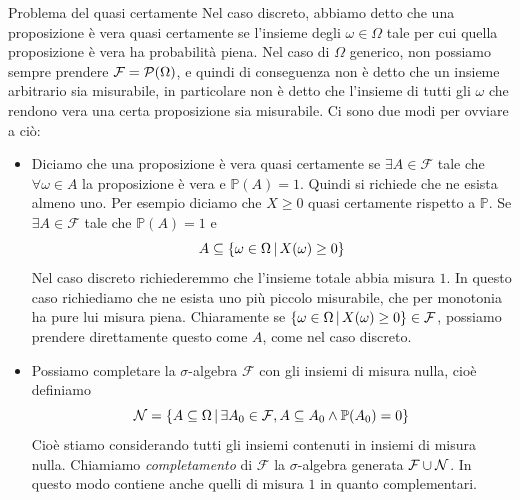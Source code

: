 \documentclass[a4paper]{article}
\begin{document}
\begin{snippetnote}{Problema del quasi certamente}
    Nel caso discreto, abbiamo detto che una proposizione
    è vera quasi certamente se l'insieme degli \(\omega \in \Omega\)
    tale per cui quella proposizione è vera ha probabilità piena.
    Nel caso di \(\Omega\) generico, non possiamo sempre prendere \(\mathcal F = \mathcal P(\Omega)\),
    e quindi di conseguenza non è detto che un insieme arbitrario sia misurabile,
    in particolare non è detto che l'insieme di tutti gli \(\omega\)
    che rendono vera una certa proposizione sia misurabile.
    Ci sono due modi per ovviare a ciò:
    \begin{itemize}
        \item Diciamo che una proposizione è vera quasi certamente se \(\exists A \in \mathcal F\)
            tale che \(\forall \omega \in A\) la proposizione è vera e \(\mathbb P(A) = 1\).
            Quindi si richiede che ne esista almeno uno. Per esempio diciamo che \(X \geq 0\)
            quasi certamente rispetto a \(\mathbb P\).
            Se \(\exists A \in \mathcal F\) tale che \(\mathbb P(A) = 1\) e \[
                A \subseteq \left\{
                    \omega \in \Omega \,|\, X(\omega) \geq 0
                \right\}
            \]
            Nel caso discreto richiederemmo che l'insieme totale abbia misura \(1\).
            In questo caso richiediamo che ne esista uno più piccolo misurabile, che per monotonia ha pure lui
            misura piena.
            Chiaramente se \(\left\{
                    \omega \in \Omega \,|\, X(\omega) \geq 0
            \right\} \in \mathcal F\), possiamo prendere direttamente questo come \(A\), come nel caso discreto.
        \item Possiamo completare la \(\sigma\)-algebra \(\mathcal F\)
            con gli insiemi di misura nulla, cioè definiamo \[
                \mathcal N = \left\{
                    A \subseteq \Omega \,|\, \exists A_0 \in \mathcal F,
                    A \subseteq A_0 \land \mathbb P(A_0) = 0
                \right\}
            \]
            Cioè stiamo considerando tutti gli insiemi contenuti in insiemi di misura nulla.
            Chiamiamo \emph{completamento} di \(\mathcal F\) la \(\sigma\)-algebra generata
            \(\mathcal F \cup \mathcal N\).
            In questo modo contiene anche quelli di misura \(1\) in quanto complementari.
    \end{itemize}
\end{snippetnote}
\end{document}
